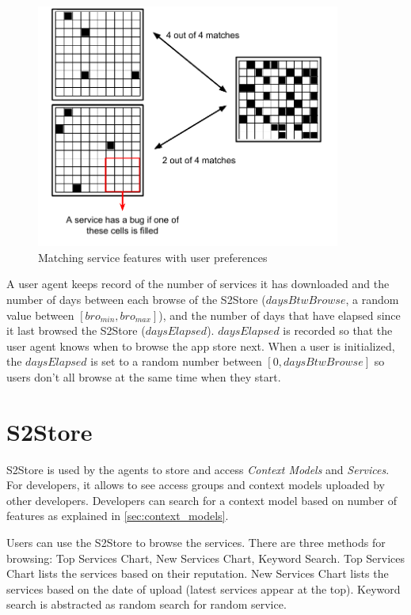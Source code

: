 \begin{figure}[!htb]
  \centering
  \includegraphics[width=10cm]{figures/user_service_feature_matching.pdf}
  \caption{Matching service features with user preferences}
  \label{fig:user-service-feature-matching}
\end{figure}

A user agent keeps record of the number of services it has downloaded and the number of days between each browse of the S2Store ($daysBtwBrowse$, a random value between $[bro_{min}, bro_{max}]$), and the number of days that have elapsed since it last browsed the S2Store ($daysElapsed$). $daysElapsed$ is recorded so that the user agent knows when to browse the app store next. When a user is initialized, the $daysElapsed$ is set to a random number between $[0, daysBtwBrowse]$ so users don't all browse at the same time when they start.

\section{S2Store}

S2Store is used by the agents to store and access \emph{Context Models} and \emph{Services}. For developers, it allows to see access groups and context models uploaded by other developers. Developers can search for a context model based on number of features as explained in \ref{sec:context_models}.

Users can use the S2Store to browse the services. There are three methods for browsing: Top Services Chart, New Services Chart, Keyword Search. Top Services Chart lists the services based on their reputation. New Services Chart lists the services based on the date of upload (latest services appear at the top). Keyword search is abstracted as random search for random service.

